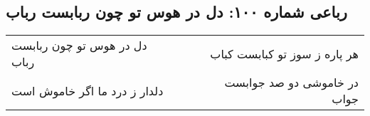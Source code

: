 \begin{center}
\section*{رباعی شماره ۱۰۰: دل در هوس تو چون ربابست رباب}
\label{sec:0100}
\begin{longtable}{l p{0.5cm} r}
دل در هوس تو چون ربابست رباب
&&
هر پاره ز سوز تو کبابست کباب
\\
دلدار ز درد ما اگر خاموش است
&&
در خاموشی دو صد جوابست جواب
\\
\end{longtable}
\end{center}
